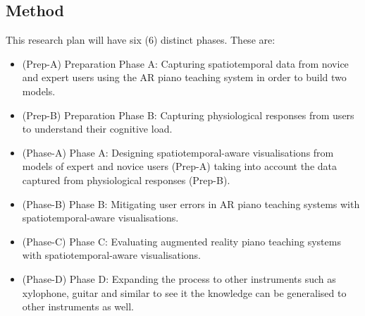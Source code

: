 \documentclass[manuscript,screen]{acmart}
\begin{document}
\subsection{Method}
This research plan will have six (6) distinct phases. These are:
\begin{itemize}
    \item (Prep-A) Preparation Phase A: Capturing spatiotemporal data from novice and expert users using the AR piano teaching system in order to build two models. 
    \item (Prep-B) Preparation Phase B: Capturing physiological responses from users to understand their cognitive load. 
    \item (Phase-A) Phase A: Designing spatiotemporal-aware visualisations from models of expert and novice users (Prep-A) taking into account the data captured from physiological responses (Prep-B).
    \item (Phase-B) Phase B: Mitigating user errors in AR piano teaching systems with spatiotemporal-aware visualisations.
    \item (Phase-C) Phase C: Evaluating augmented reality piano teaching systems with spatiotemporal-aware visualisations.
    \item (Phase-D) Phase D: Expanding the process to other instruments such as xylophone, guitar and similar to see it the knowledge can be generalised to other instruments as well. 
\end{itemize}
\end{document}

